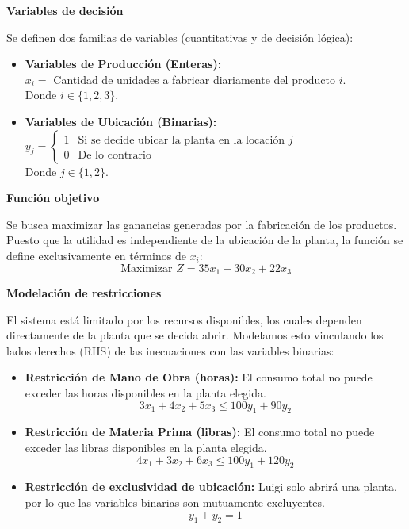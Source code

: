 \documentclass[10pt,a4paper]{article}
\begin{document}
\vspace{3mm}

\textbf{Variables de decisión}

Se definen dos familias de variables (cuantitativas y de decisión lógica):
\begin{itemize}
    \item \textbf{Variables de Producción (Enteras):} \\
    $x_i = $ Cantidad de unidades a fabricar diariamente del producto $i$. \\
    Donde $i \in \{1, 2, 3\}$.
    
    \item \textbf{Variables de Ubicación (Binarias):} \\
    $y_j = 
    \begin{cases} 
    1 & \text{Si se decide ubicar la planta en la locación } j \\
    0 & \text{De lo contrario}
    \end{cases}$ \\
    Donde $j \in \{1, 2\}$.
\end{itemize}

\vspace{3mm}
\textbf{Función objetivo}

Se busca maximizar las ganancias generadas por la fabricación de los productos. Puesto que la utilidad es independiente de la ubicación de la planta, la función se define exclusivamente en términos de $x_i$:
\[ \text{Maximizar } Z = 35x_1 + 30x_2 + 22x_3 \]

\vspace{3mm}
\textbf{Modelación de restricciones}

El sistema está limitado por los recursos disponibles, los cuales dependen directamente de la planta que se decida abrir. Modelamos esto vinculando los lados derechos (RHS) de las inecuaciones con las variables binarias:

\begin{itemize}
    \item \textbf{Restricción de Mano de Obra (horas):} El consumo total no puede exceder las horas disponibles en la planta elegida.
    \[ 3x_1 + 4x_2 + 5x_3 \le 100y_1 + 90y_2 \]

    \item \textbf{Restricción de Materia Prima (libras):} El consumo total no puede exceder las libras disponibles en la planta elegida.
    \[ 4x_1 + 3x_2 + 6x_3 \le 100y_1 + 120y_2 \]

    \item \textbf{Restricción de exclusividad de ubicación:} Luigi solo abrirá una planta, por lo que las variables binarias son mutuamente excluyentes.
    \[ y_1 + y_2 = 1 \]
\end{itemize}
\end{document}

